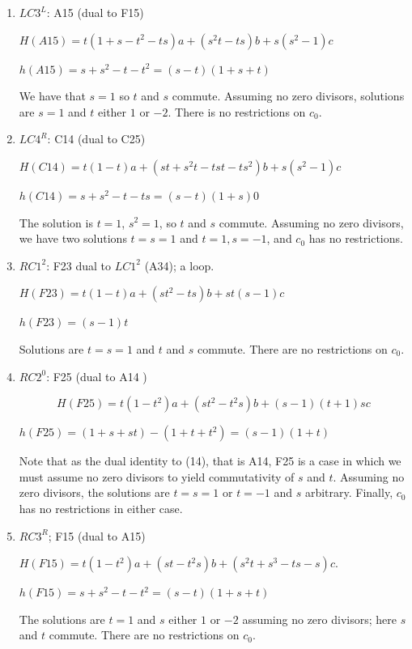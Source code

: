 \documentclass[11pt]{amsart}
\theoremstyle{definition}
\begin{document}
\begin{enumerate}
    
    \item[(15)] $LC3^L$:  A15 (dual to F15) 

$H(A15) = t(1+s-t^2-ts)a+(s^2t-ts)b+s(s^2-1)c$

$h(A15) = s+s^2-t-t^2=(s-t)(1+s+t) $

We have that $s=1$ so $t$ and $s$ commute. Assuming no zero divisors, solutions are $s=1$ and $t$ either $1$ or $-2$. There is no restrictions on $c_0$.
    
    
    \item[(16)] $LC4^R$: C14 (dual to C25)
    
    $H(C14) = t(1-t)a+(st+s^2t-tst-ts^2)b+s(s^2-1)c$

    $h(C14) = s+s^2-t-ts = (s-t)(1+s)0$

    The solution is $t=1$, $s^2=1$, so $t$ and $s$ commute. Assuming no zero divisors, we have two solutions $t=s=1$ and $t=1, s=-1$, and $c_0$ has no restrictions.
    
    
    \item[(17)] $RC1^2$: F23 dual to $LC1^2$ (A34); a loop.

    $H(F23) = t(1-t)a+(st^2-ts)b+st(s-1)c$

    
    $h(F23) = (s-1)t$

    Solutions are $t=s=1$ and $t$ and $s$ commute. There are no restrictions on $c_0$. 
    
    \item[(18)] $RC2^0$: F25  (dual to A14 )
    
    $$H(F25)=t(1-t^2)a + (st^2-t^2s)b+ (s-1)(t+1)sc$$
    
    $h(F25)=(1+s+st)-(1+t+t^2)=(s-1)(1+t)$


    
    Note that as the dual identity to (14), that is A14, F25 is a case in which we must assume no zero divisors to yield commutativity  of $s$ and $t$. Assuming no zero divisors, the solutions are $t=s=1$ or $t=-1$ and $s$ arbitrary. Finally, $c_0$ has no restrictions in either case. 

    
    
    
\item[(19)] $RC3^R$; F15 (dual to A15)

    $H(F15) = t(1-t^2)a+(st-t^2s)b+(s^2t+s^3-ts-s)c$.

    $h(F15) = s+s^2-t-t^2=(s-t)(1+s+t)$


     The solutions are $t=1$ and $s$ either $1$ or $-2$ assuming no zero divisors; here $s$ and $t$ commute. There are no restrictions on $c_0$. 


\end{enumerate}
\end{document}
